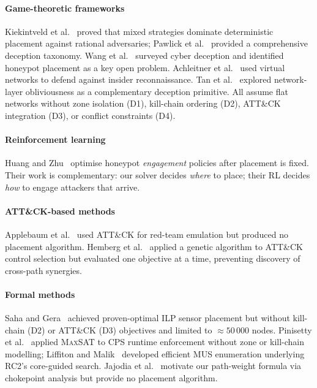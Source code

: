 \documentclass[journal]{IEEEtran}
\newcommand{\MAXSAT}{\textsc{MaxSAT}}
\begin{document}
\paragraph{Game-theoretic frameworks}
Kiekintveld et al.~\cite{kiekintveld2015} proved that mixed strategies
dominate deterministic placement against rational adversaries; Pawlick
et al.~\cite{pawlick2019} provided a comprehensive deception taxonomy.
Wang et al.~\cite{wang2018} surveyed cyber deception and identified
honeypot placement as a key open problem. Achleitner et
al.~\cite{achleitner2017} used virtual networks to defend against
insider reconnaissance. Tan et al.~\cite{tan2011} explored
network-layer obliviousness as a complementary deception primitive.
All assume flat networks without zone isolation (D1), kill-chain
ordering (D2), ATT\&CK integration (D3), or conflict constraints (D4).

\paragraph{Reinforcement learning}
Huang and Zhu~\cite{huang2019} optimise honeypot \emph{engagement}
policies after placement is fixed. Their work is complementary: our
solver decides \emph{where} to place; their RL decides \emph{how} to
engage attackers that arrive.

\paragraph{ATT\&CK-based methods}
Applebaum et al.~\cite{applebaum2016} used ATT\&CK for red-team
emulation but produced no placement algorithm. Hemberg
et al.~\cite{hemberg2018} applied a genetic algorithm to ATT\&CK
control selection but evaluated one objective at a time, preventing
discovery of cross-path synergies.

\paragraph{Formal methods}
Saha and Gera~\cite{saha2015} achieved proven-optimal ILP sensor
placement but without kill-chain (D2) or ATT\&CK (D3) objectives and
limited to ${\approx}50\,000$ nodes. Pinisetty et
al.~\cite{pinisetty2017} applied \MAXSAT{} to CPS runtime enforcement
without zone or kill-chain modelling; Liffiton and
Malik~\cite{liffiton2016} developed efficient MUS enumeration
underlying RC2's core-guided search. Jajodia et al.~\cite{jajodia2005}
motivate our path-weight formula via chokepoint analysis but provide no
placement algorithm.
\end{document}
